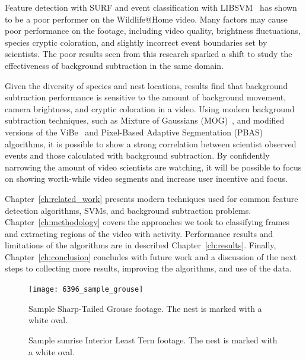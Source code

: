 Feature detection with SURF and event classification with LIBSVM~\cite{chang_2011_libsvm} has shown to be a poor performer on the Wildlife@Home video. Many factors may cause poor performance on the footage, including video quality, brightness fluctuations, species cryptic coloration, and slightly incorrect event boundaries set by scientists. The poor results seen from this research sparked a shift to study the effectiveness of background subtraction in the same domain.

Given the diversity of species and nest locations, results find that background subtraction performance is sensitive to the amount of background movement, camera brightness, and cryptic coloration in a video. Using modern background subtraction techniques, such as Mixture of Gaussians (MOG)~\cite{power_2002_understanding}, and modified versions of the ViBe~\cite{van_2014_vibe} and Pixel-Based Adaptive Segmentation (PBAS)~\cite{hofmann_2012_background} algorithms, it is possible to show a strong correlation between scientist observed events and those calculated with background subtraction. By confidently narrowing the amount of video scientists are watching, it will be possible to focus on showing worth-while video segments and increase user incentive and focus.

Chapter~\ref{ch:related_work} presents modern techniques used for common feature detection algorithms, SVMs, and background subtraction problems. Chapter~\ref{ch:methodology} covers the approaches we took to classifying frames and extracting regions of the video with activity. Performance results and limitations of the algorithms are in described Chapter~\ref{ch:results}. Finally, Chapter~\ref{ch:conclusion} concludes with future work and a discussion of the next steps to collecting more results, improving the algorithms, and use of the data.

\begin{figure}[!t]
\centering
\texttt{[image: 6396\_sample\_grouse]}
\caption{Sample Sharp-Tailed Grouse footage. The nest is marked with a white oval.}
\label{fig:sample_grouse}
\end{figure}

\begin{figure}
\centering
\subfloat[Sample I]{\texttt{[image: 59032\_1]}
\label{fig:first_case}}
\hfil
\subfloat[Sample II]{\texttt{[image: 59032\_2]}
\label{fig:second_case}}
\hfil
{}
\caption{Sample sunrise Interior Least Tern footage. The nest is marked with a white oval.}
\label{fig:example_tern_video}
\end{figure}

